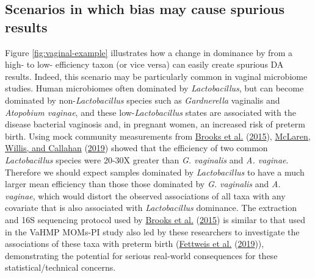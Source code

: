 \documentclass[
]{article}
\theoremstyle{definition}
\theoremstyle{definition}
\theoremstyle{definition}
\theoremstyle{definition}
\theoremstyle{remark}
\begin{document}
\hypertarget{scenarios-in-which-bias-may-cause-spurious-results}{%
\subsection{Scenarios in which bias may cause spurious results}\label{scenarios-in-which-bias-may-cause-spurious-results}}

Figure \ref{fig:vaginal-example} illustrates how a change in dominance by from a high- to low- efficiency taxon (or vice versa) can easily create spurious DA results.
Indeed, this scenario may be particularly common in vaginal microbiome studies.
Human microbiomes often dominated by \emph{Lactobacillus}, but can become dominated by non-\emph{Lactobacillus} species such as \emph{Gardnerella} vaginalis and \emph{Atopobium vaginae}, and these low-\emph{Lactobacillus} states are associated with the disease bacterial vaginosis and, in pregnant women, an increased risk of preterm birth.
Using mock community measurements from \protect\hyperlink{ref-brooks2015thet}{Brooks et al.} (\protect\hyperlink{ref-brooks2015thet}{2015}), \protect\hyperlink{ref-mclaren2019cons}{McLaren, Willis, and Callahan} (\protect\hyperlink{ref-mclaren2019cons}{2019}) showed that the efficiency of two common \emph{Lactobacillus} species were 20-30X greater than \emph{G. vaginalis} and \emph{A. vaginae}.
Therefore we should expect samples dominated by \emph{Lactobacillus} to have a much larger mean efficiency than those those dominated by \emph{G. vaginalis} and \emph{A. vaginae}, which would distort the observed associations of all taxa with any covariate that is also associated with \emph{Lactobacillus} dominance.
The extraction and 16S sequencing protocol used by \protect\hyperlink{ref-brooks2015thet}{Brooks et al.} (\protect\hyperlink{ref-brooks2015thet}{2015}) is similar to that used in the VaHMP MOMs-PI study also led by these researchers to investigate the associations of these taxa with preterm birth (\protect\hyperlink{ref-fettweis2019thev}{Fettweis et al.} (\protect\hyperlink{ref-fettweis2019thev}{2019})), demonstrating the potential for serious real-world consequences for these statistical/technical concerns.
\end{document}
